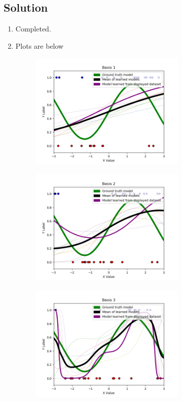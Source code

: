 \documentclass[submit]{harvardml}
\begin{document}
\subsection*{Solution}
\begin{enumerate}
    \item Completed.
    \item Plots are below 
    \begin{figure} [h!]
        \centering
        \includegraphics[width=0.7\textwidth]{HW2/Basis 1.png}
    \end{figure}
    \begin{figure} [h!]
        \centering
        \includegraphics[width=0.7\textwidth]{HW2/Basis 2.png}
    \end{figure}
    \begin{figure} [h!]
        \centering
        \includegraphics[width=0.7\textwidth]{HW2/Basis 3.png}

\end{figure}
\end{enumerate}
\end{document}
